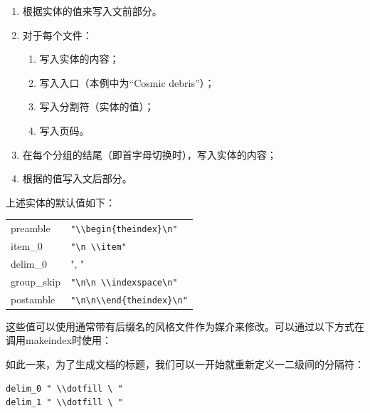 \begin{enumerate}
    \item 根据实体的值来写入文前部分。
    \item 对于每个文件：
    \begin{enumerate}
        \item 写入实体的内容；
        \item 写入入口（本例中为“Cosmic debris”）；
        \item 写入分割符（实体的值）；
        \item 写入页码。
    \end{enumerate}
    \item 在每个分组的结尾（即首字母切换时），写入实体的内容；
    \item 根据的值写入文后部分。
\end{enumerate}

上述实体的默认值如下：

\begin{center}
    \begin{dmd}
        \begin{tabular}{|l|l|}
            \hline
            preamble & \verb+"\\begin{theindex}\n"+\\
            item\_0 &\verb+"\n \\item"+\\
            delim\_0 & ", "\\
            group\_skip & \verb+"\n\n \\indexspace\n"+\\
            postamble & \verb+"\n\n\\end{theindex}\n"+\\
            \hline
        \end{tabular}
    \end{dmd}
\end{center}

这些值可以使用通常带有后缀名的风格文件作为媒介来修改。可以通过以下方式在调用\textsf{makeindex}时使用：


如此一来，为了生成文档的标题，我们可以一开始就重新定义一二级间的分隔符：

\begin{dmd}
\begin{verbatim}
delim_0 " \\dotfill \ "
delim_1 " \\dotfill \ "
\end{verbatim}
\end{dmd}

